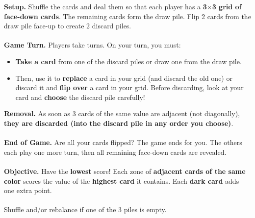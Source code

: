 \documentclass[a4paper]{memoir}
\begin{document}
{\footnotesize

\noindent
\textbf{ Setup.} Shuffle the cards and deal them so that each player has a \textbf{3$\times$3 grid of face-down cards}. 
The remaining cards form the draw pile. Flip 2 cards from the draw pile face-up to create 2 discard piles.
\\
\\
\textbf{ Game Turn.} Players take turns. On your turn, you must:
\begin{itemize}
    \item \textbf{Take a card} from one of the discard piles or draw one from the draw pile.
    \item Then, use it to \textbf{replace} a card in your grid (and discard the old one) or discard it and \textbf{flip over} a card in your grid.
    Before discarding, look at your card and \textbf{choose} the discard pile carefully!
\end{itemize}
\textbf{ Removal.} As soon as 3 cards of the same value are adjacent (not diagonally), \textbf{they are discarded (into the discard pile in any order you choose)}.
\\
\\
\textbf{ End of Game.} Are all your cards flipped? The game ends for you. 
The others each play one more turn, then all remaining face-down cards are revealed.
\\
\\
\textbf{ Objective.} Have the \textbf{lowest} score! 
Each zone of \textbf{adjacent cards of the same color} scores the value of the \textbf{highest card} it contains.
Each \textbf{dark card} adds one extra point.
\\
\\
\noindent
{} Shuffle and/or rebalance if one of the 3 piles is empty.
}
\end{document}
